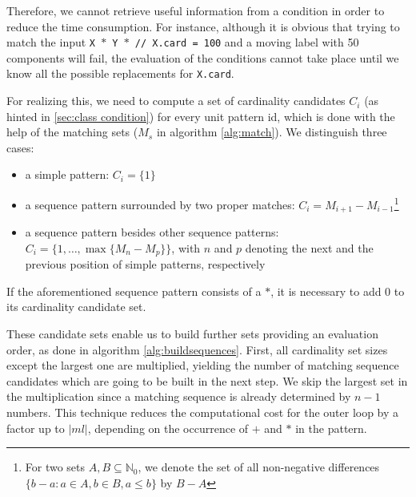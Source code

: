 \documentclass{sig-alternate}
\begin{document}
Therefore, we cannot retrieve useful information from a condition in order to reduce the time consumption. For instance, although it is obvious that trying to match the input \texttt{X $\ast$ Y $\ast$ // X.card = 100} and a moving label with 50 components will fail, the evaluation of the conditions cannot take place until we know all the possible replacements for \texttt{X.card}.

For realizing this, we need to compute a set of cardinality candidates $C_i$ (as hinted in \ref{sec:class condition}) for every unit pattern id, which is done with the help of the matching sets ($M_s$ in algorithm \ref{alg:match}). We distinguish three cases:
\begin{itemize}
  \item a simple pattern: $C_i=\{1\}$
  \item a sequence pattern surrounded by two proper matches: $C_i=M_{i+1}-M_{i-1}$\footnote{For two sets $A, B\subseteq \mathbb{N}_0$, we denote the set of all non-negative differences $\{b-a\colon a\in A, b\in B, a\leq b\}$ by $B-A$}
  \item a sequence pattern besides other sequence patterns: $C_{i}=\{1,\dots,\max\{M_{n}-M_{p}\}\}$, with $n$ and $p$ denoting the next and the previous position of simple patterns, respectively
\end{itemize}

If the aforementioned sequence pattern consists of a $\ast$, it is necessary to add $0$ to its cardinality candidate set.

These candidate sets enable us to build further sets providing an evaluation order, as done in algorithm \ref{alg:buildsequences}. First, all cardinality set sizes except the largest one are multiplied, yielding the number of matching sequence candidates which are going to be built in the next step. We skip the largest set in the multiplication since a matching sequence is already determined by $n-1$ numbers. This technique reduces the computational cost for the outer loop by a factor up to $\left|ml\right|$, depending on the occurrence of $+$ and $\ast$ in the pattern.
\end{document}
